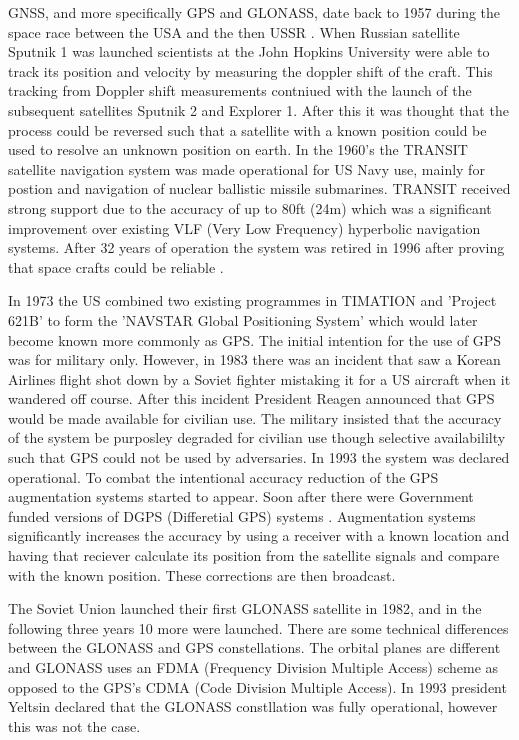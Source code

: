 GNSS, and more specifically GPS and GLONASS, date back to 1957 during the space race between the USA and the then USSR \cite{RN43}. When Russian satellite Sputnik 1 was
launched scientists at the John Hopkins University were able to track its position and velocity by measuring the doppler shift of the craft. This tracking from Doppler
shift measurements contniued with the launch of the subsequent satellites Sputnik 2 and Explorer 1. After this it was thought that the process could be reversed such that
a satellite with a known position could be used to resolve an unknown position on earth. In the 1960's the TRANSIT satellite navigation system was made operational for US
Navy use, mainly for postion and navigation of nuclear ballistic missile submarines. TRANSIT received strong support due to the accuracy of up to 80ft (24m) which was a
significant improvement over existing VLF (Very Low Frequency) hyperbolic navigation systems. After 32 years of operation the system was retired in 1996 after proving
that space crafts could be reliable \cite{RN45}. 

In 1973 the US combined two existing programmes in TIMATION and 'Project 621B' to form the 'NAVSTAR Global Positioning System' which would later become known more
commonly as GPS. The initial intention for the use of GPS was for military only. However, in 1983 there was an incident that saw a Korean Airlines flight shot down by a
Soviet fighter mistaking it for a US aircraft when it wandered off course. After this incident President Reagen announced that GPS would be made available for civilian
use. The military insisted that the accuracy of the system be purposley degraded for civilian use though selective availabililty such that GPS could not be used by
adversaries. In 1993 the system was declared operational. To combat the intentional accuracy reduction of the GPS augmentation systems started to appear. Soon
after there were Government funded versions of DGPS (Differetial GPS) systems \cite{RN43}. Augmentation systems significantly increases the accuracy by using a receiver
with a known location and having that reciever calculate its position from the satellite signals and compare with the known position. These corrections are then
broadcast. 

The Soviet Union launched their first GLONASS satellite in 1982, and in the following three years 10 more were launched. There are some technical differences between the
GLONASS and GPS constellations. The orbital planes are different and GLONASS uses an FDMA (Frequency Division Multiple Access) scheme as opposed to the GPS's CDMA (Code
Division Multiple Access). In 1993 president Yeltsin declared that the GLONASS constllation was fully operational, however this was not the case. 

